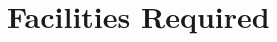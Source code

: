\documentclass[12pt,vi,oneside,table]{report}
\begin{document}
%
%


    \section{Facilities Required}
    \label{sec:facilities}
\end{document}
